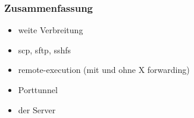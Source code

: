 \begin{frame}
\frametitle{Zusammenfassung}
\begin{itemize}
\item weite Verbreitung
\item scp, sftp, sshfs
\item remote-execution (mit und ohne X forwarding)
\item Porttunnel
\item der Server
\end{itemize}
\end{frame}